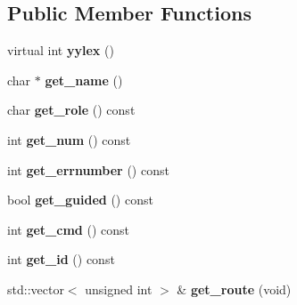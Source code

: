 \subsection*{Public Member Functions}
\begin{DoxyCompactItemize}
\item 
\hypertarget{classjustine_1_1robocar_1_1CarLexer_a141ae0c2aa9fb37b6045f4126377aa4e}{virtual int {\bfseries yylex} ()}\label{classjustine_1_1robocar_1_1CarLexer_a141ae0c2aa9fb37b6045f4126377aa4e}

\item 
\hypertarget{classjustine_1_1robocar_1_1CarLexer_a64216c04da2303504e4761b8b1f3cbd7}{char $\ast$ {\bfseries get\-\_\-name} ()}\label{classjustine_1_1robocar_1_1CarLexer_a64216c04da2303504e4761b8b1f3cbd7}

\item 
\hypertarget{classjustine_1_1robocar_1_1CarLexer_a5d7b64b987f72638492b5d7fb874e027}{char {\bfseries get\-\_\-role} () const }\label{classjustine_1_1robocar_1_1CarLexer_a5d7b64b987f72638492b5d7fb874e027}

\item 
\hypertarget{classjustine_1_1robocar_1_1CarLexer_a5f76db35df8712c3ca96941dea284261}{int {\bfseries get\-\_\-num} () const }\label{classjustine_1_1robocar_1_1CarLexer_a5f76db35df8712c3ca96941dea284261}

\item 
\hypertarget{classjustine_1_1robocar_1_1CarLexer_a2d033282421fefd97de5e527dd9098e1}{int {\bfseries get\-\_\-errnumber} () const }\label{classjustine_1_1robocar_1_1CarLexer_a2d033282421fefd97de5e527dd9098e1}

\item 
\hypertarget{classjustine_1_1robocar_1_1CarLexer_a32c2849b020dcc0d17f4d0b7c63e4bd4}{bool {\bfseries get\-\_\-guided} () const }\label{classjustine_1_1robocar_1_1CarLexer_a32c2849b020dcc0d17f4d0b7c63e4bd4}

\item 
\hypertarget{classjustine_1_1robocar_1_1CarLexer_a0f33aba8fabacd366d1cc5e1569de648}{int {\bfseries get\-\_\-cmd} () const }\label{classjustine_1_1robocar_1_1CarLexer_a0f33aba8fabacd366d1cc5e1569de648}

\item 
\hypertarget{classjustine_1_1robocar_1_1CarLexer_ab93d617ee8e18853ad555061af508259}{int {\bfseries get\-\_\-id} () const }\label{classjustine_1_1robocar_1_1CarLexer_ab93d617ee8e18853ad555061af508259}

\item 
\hypertarget{classjustine_1_1robocar_1_1CarLexer_a74023d4b3f9257dea8b65d9c65159c39}{std\-::vector$<$ unsigned int $>$ \& {\bfseries get\-\_\-route} (void)}\label{classjustine_1_1robocar_1_1CarLexer_a74023d4b3f9257dea8b65d9c65159c39}


\end{DoxyCompactItemize}
